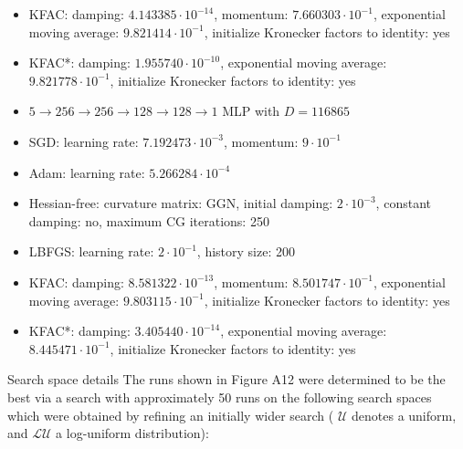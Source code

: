 \documentclass[10pt]{article}
\begin{document}
\begin{itemize}
  \item KFAC: damping: $4.143385 \cdot 10^{-14}$, momentum: $7.660303 \cdot 10^{-1}$, exponential moving average: $9.821414 \cdot 10^{-1}$, initialize Kronecker factors to identity: yes
  \item KFAC*: damping: $1.955740 \cdot 10^{-10}$, exponential moving average: $9.821778 \cdot 10^{-1}$, initialize Kronecker factors to identity: yes
  \item $5 \rightarrow 256 \rightarrow 256 \rightarrow 128 \rightarrow 128 \rightarrow 1$ MLP with $D=116865$
  \item SGD: learning rate: $7.192473 \cdot 10^{-3}$, momentum: $9 \cdot 10^{-1}$
  \item Adam: learning rate: $5.266284 \cdot 10^{-4}$
  \item Hessian-free: curvature matrix: GGN, initial damping: $2 \cdot 10^{-3}$, constant damping: no, maximum CG iterations: 250
  \item LBFGS: learning rate: $2 \cdot 10^{-1}$, history size: 200
  \item KFAC: damping: $8.581322 \cdot 10^{-13}$, momentum: $8.501747 \cdot 10^{-1}$, exponential moving average: $9.803115 \cdot 10^{-1}$, initialize Kronecker factors to identity: yes
  \item KFAC*: damping: $3.405440 \cdot 10^{-14}$, exponential moving average: $8.445471 \cdot 10^{-1}$, initialize Kronecker factors to identity: yes
\end{itemize}

Search space details The runs shown in Figure A12 were determined to be the best via a search with approximately 50 runs on the following search spaces which were obtained by refining an initially wider search ( $\mathcal{U}$ denotes a uniform, and $\mathcal{L U}$ a log-uniform distribution):
\end{document}
